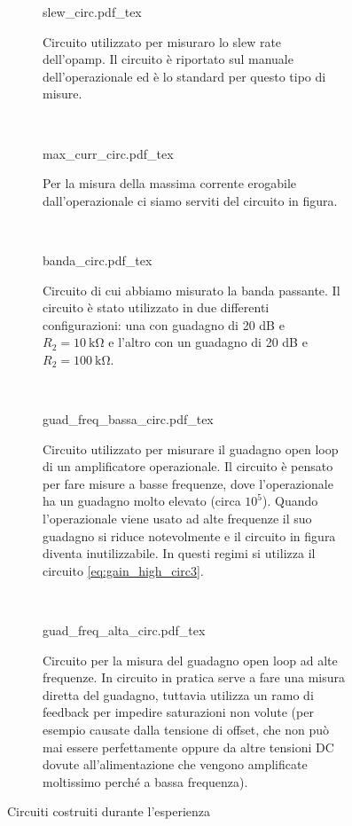 \begin{figure*}[t]
        \centering
        \small
        \begin{subfigure}[b]{0.32\textwidth}
            \def\svgwidth{\columnwidth}
            {slew_circ.pdf_tex}
            \caption{Circuito utilizzato per misuraro lo slew rate dell'opamp. Il circuito è
		riportato sul manuale dell'operazionale ed è lo standard per questo tipo di misure.}
            \label{fig:slew_circ3}
        \end{subfigure}
        ~
        \begin{subfigure}[b]{0.32\textwidth}
            \def\svgwidth{\columnwidth}
            {max_curr_circ.pdf_tex}
            \caption{Per la misura della massima corrente erogabile dall'operazionale ci siamo
		serviti del circuito in figura.}
            \label{fig:max_curr_circ3}
        \end{subfigure}
        ~
        \begin{subfigure}[b]{0.32\textwidth}
            \def\svgwidth{\columnwidth}
            {banda_circ.pdf_tex}
            \caption{Circuito di cui abbiamo misurato la banda passante. Il circuito è stato utilizzato
		in due differenti configurazioni: una con guadagno di 20 dB e $R_2 = \SI{10}{\kilo\ohm}$
		e l'altro con un guadagno di 20 dB e $R_2 = \SI{100}{\kilo\ohm}$.}
            \label{fig:banda_circ3}
        \end{subfigure}
        ~
        \begin{subfigure}[b]{0.32\textwidth}
            \def\svgwidth{\columnwidth}
	    \vspace{0.5cm}
            {guad_freq_bassa_circ.pdf_tex}
	    \vspace{0pt}
            \caption{Circuito utilizzato per misurare il guadagno open loop di un amplificatore
		operazionale. Il circuito è pensato per fare misure a basse frequenze, dove
		l'operazionale ha un guadagno molto elevato (circa $10^5$). Quando l'operazionale viene
		usato ad alte frequenze il suo guadagno si riduce notevolmente e il circuito in figura
		diventa inutilizzabile. In questi regimi si utilizza il circuito \ref{eq:gain_high_circ3}.}
            \label{fig:gain_low_circ3}
        \end{subfigure}
        ~
        \begin{subfigure}[b]{0.32\textwidth}
            \def\svgwidth{\columnwidth}
            {guad_freq_alta_circ.pdf_tex}
	    \vspace{0pt}
            \caption{Circuito per la misura del guadagno open loop ad alte frequenze. In circuito in pratica
		serve a fare una misura diretta del guadagno, tuttavia utilizza un ramo di feedback per impedire
		saturazioni non volute (per esempio causate dalla tensione di offset, che non può mai essere
		perfettamente oppure da altre tensioni DC dovute all'alimentazione che vengono amplificate moltissimo
		perché a bassa frequenza).}
            \label{fig:gain_high_circ3}
        \end{subfigure}

        \caption{Circuiti costruiti durante l'esperienza}
        \label{fig:circuits3}
\end{figure*}
